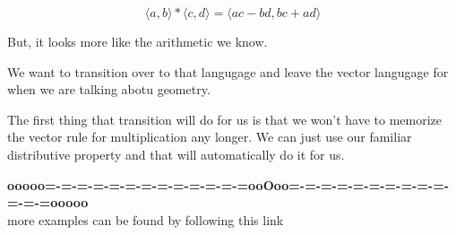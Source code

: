 \documentclass{ximera}
\begin{document}
\[    \langle a, b \rangle  * \langle c, d \rangle =   \langle a c - b d, b c + a d \rangle   \]



But, it looks more like the arithmetic we know.  


We want to transition over to that langugage and leave the vector langugage for when we are talking abotu geometry.


The first thing that transition will do for us is that we won't have to memorize the vector rule for multiplication any longer.  We can just use our familiar distributive property and that will automatically do it for us.























\begin{center}
\textbf{\textcolor{green!50!black}{ooooo=-=-=-=-=-=-=-=-=-=-=-=-=ooOoo=-=-=-=-=-=-=-=-=-=-=-=-=ooooo}} \\

more examples can be found by following this link\\ 

\end{center}
\end{document}
